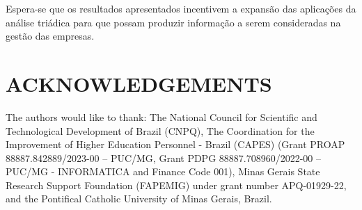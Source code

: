 \documentclass[kdmile,a4paper]{kdmile} %
\begin{document}
Espera-se que os resultados apresentados incentivem a expansão das aplicações da análise triádica para que possam produzir informação a serem consideradas na gestão das empresas.

\section*{\uppercase{Acknowledgements}}
The authors would like to thank: The National Council for Scientific and Technological Development of Brazil (CNPQ), The Coordination for the Improvement of Higher Education Personnel - Brazil (CAPES) (Grant
PROAP 88887.842889/2023-00 – PUC/MG, Grant
PDPG 88887.708960/2022-00 – PUC/MG - INFORMATICA and Finance Code 001), Minas Gerais State Research Support Foundation (FAPEMIG) under grant number APQ-01929-22, and the Pontifical Catholic University of Minas Gerais, Brazil.








\end{document}
